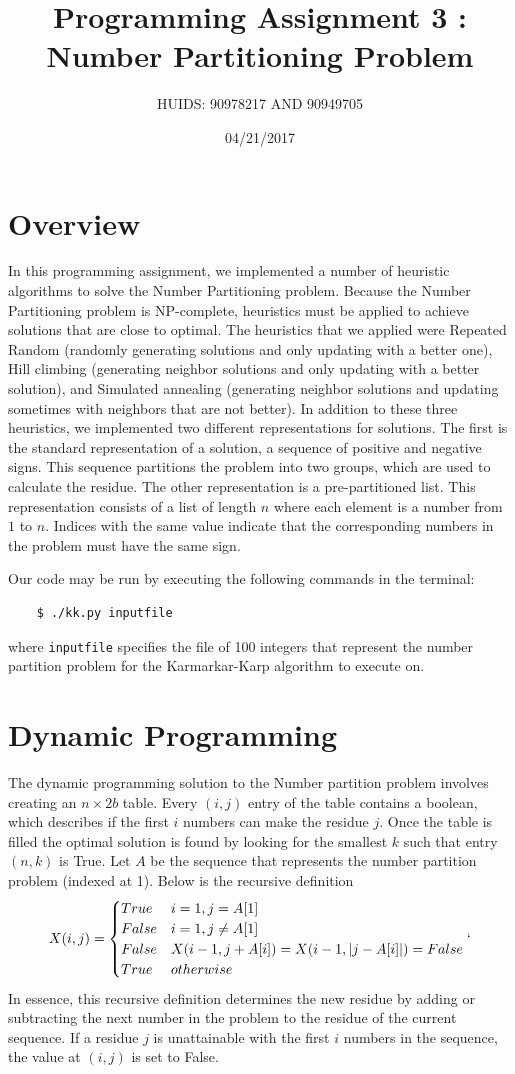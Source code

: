 \documentclass[a4paper]{article}
\title{Programming Assignment 3 : Number Partitioning Problem}
\author{HUIDS: 90978217 AND 90949705}
\date{04/21/2017}
\begin{document}
	
	\maketitle
	
	\section{Overview}
	In this programming assignment, we implemented a number of heuristic algorithms to solve the Number Partitioning problem. Because the Number Partitioning problem is NP-complete, heuristics must be applied to achieve solutions that are close to optimal. The heuristics that we applied were Repeated Random (randomly generating solutions and only updating with a better one), Hill climbing (generating neighbor solutions and only updating with a better solution), and Simulated annealing (generating neighbor solutions and updating sometimes with neighbors that are not better). In addition to these three heuristics, we implemented two different representations for solutions. The first is the standard representation of a solution, a sequence of positive and negative signs. This sequence partitions the problem into two groups, which are used to calculate the residue. The other representation is a pre-partitioned list. This representation consists of a list of length $n$ where each element is a number from $1$ to $n$. Indices with the same value indicate that the corresponding numbers in the problem must have the same sign.
	
	Our code may be run by executing the following commands in the terminal:
	\begin{verbatim}
	$ ./kk.py inputfile
	\end{verbatim}
	where \texttt{inputfile} specifies the file of 100 integers that represent the number partition problem for the Karmarkar-Karp algorithm to execute on.
	
	\section{Dynamic Programming}
	The dynamic programming solution to the Number partition problem involves creating an $n \times 2b$ table. Every $(i,j)$ entry of the table contains a boolean, which describes if the first $i$ numbers can make the residue $j$.  Once the table is filled the optimal solution is found by looking for the smallest $k$ such that entry $(n,k)$ is True. Let $A$ be the sequence that represents the number partition problem (indexed at 1). Below is the recursive definition
	\[X(i,j) = 
	\begin{cases}
	True & i = 1, j = A[1]\\
	False & i = 1, j \neq A[1] \\ 
	False & X(i-1, j + A[i]) = X(i-1, |j - A[i]|) = False \\
	True & otherwise
	\end{cases}`
	\]
	In essence, this recursive definition determines the new residue by adding or subtracting the next number in the problem to the residue of the current sequence. If a residue $j$ is unattainable with the first $i$ numbers in the sequence, the value at $(i,j)$ is set to False. 
	
\end{document}
